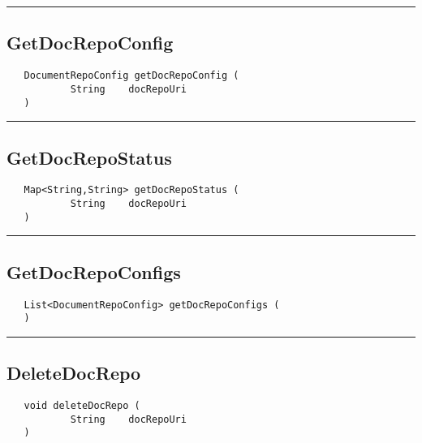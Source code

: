 \rule{15cm}{2pt}
\subsection{GetDocRepoConfig}
\label{Api:GetDocRepoConfig}
\begin{verbatim}
   DocumentRepoConfig getDocRepoConfig (
           String    docRepoUri
   )
\end{verbatim}



\rule{15cm}{2pt}
\subsection{GetDocRepoStatus}
\label{Api:GetDocRepoStatus}
\begin{verbatim}
   Map<String,String> getDocRepoStatus (
           String    docRepoUri
   )
\end{verbatim}



\rule{15cm}{2pt}
\subsection{GetDocRepoConfigs}
\label{Api:GetDocRepoConfigs}
\begin{verbatim}
   List<DocumentRepoConfig> getDocRepoConfigs (
   )
\end{verbatim}



\rule{15cm}{2pt}
\subsection{DeleteDocRepo}
\label{Api:DeleteDocRepo}
\begin{verbatim}
   void deleteDocRepo (
           String    docRepoUri
   )
\end{verbatim}



